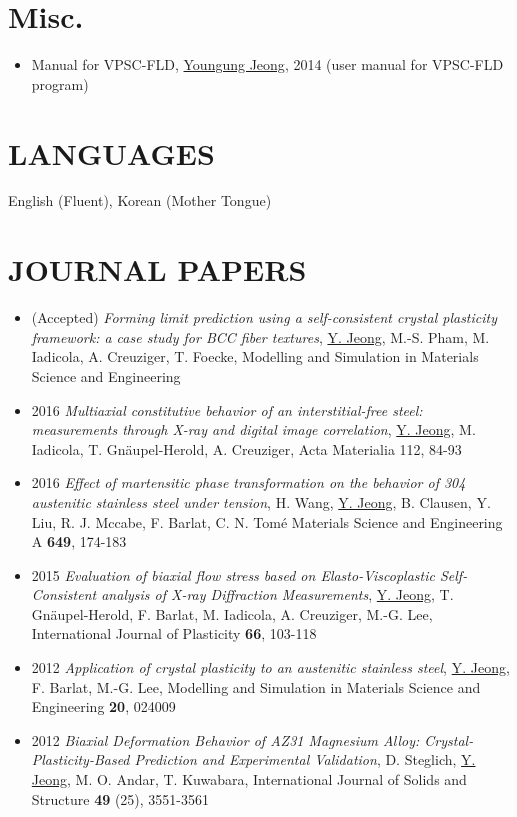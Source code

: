 \documentclass{res}
\begin{document}
\begin{resume}
  \section{Misc.}
  \begin{itemize}
  \item Manual for VPSC-FLD, \underline{Youngung Jeong}, 2014 (user manual for VPSC-FLD program)
  \end{itemize}

  \section{LANGUAGES}
  English (Fluent), Korean (Mother Tongue)

  \section{JOURNAL PAPERS}
  \begin{itemize}
  \item (Accepted) {\it Forming limit prediction using a self-consistent crystal plasticity framework: a case study for BCC fiber textures}, \underline{Y. Jeong}, M.-S. Pham, M. Iadicola, A. Creuziger, T. Foecke, Modelling and Simulation in Materials Science and Engineering
  \item 2016 {\it Multiaxial constitutive behavior of an interstitial-free steel: measurements through X-ray and digital image correlation}, \underline{Y. Jeong}, M. Iadicola, T. Gn\"{a}upel-Herold, A. Creuziger, Acta Materialia 112, 84-93
  \item 2016 {\it Effect of martensitic phase transformation on the behavior of 304 austenitic stainless steel under tension}, H. Wang, \underline{Y. Jeong}, B. Clausen, Y. Liu, R. J. Mccabe, F. Barlat, C. N. Tom\'{e} Materials Science and Engineering A {\bf 649}, 174-183
  \item 2015 {\it Evaluation of biaxial flow stress based on Elasto-Viscoplastic Self-Consistent analysis of X-ray Diffraction Measurements}, \underline{Y. Jeong}, T. Gn\"{a}upel-Herold, F. Barlat, M. Iadicola, A. Creuziger, M.-G. Lee, International Journal of Plasticity {\bf 66}, 103-118
  \item 2012 {\it Application of crystal plasticity to an austenitic stainless steel}, \underline{Y. Jeong}, F. Barlat, M.-G. Lee, Modelling and Simulation in Materials Science and Engineering {\bf 20}, 024009
  \item 2012 {\it Biaxial Deformation Behavior of AZ31 Magnesium Alloy: Crystal-Plasticity-Based Prediction and Experimental Validation}, D. Steglich, \underline{Y. Jeong}, M. O. Andar, T. Kuwabara, International Journal of Solids and Structure {\bf 49} (25), 3551-3561
  \end{itemize}


\end{resume}
\end{document}
